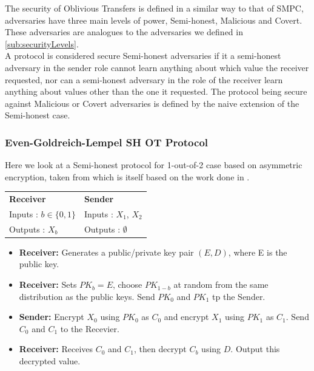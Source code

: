 \documentclass[a4paper,10pt]{article}
\begin{document}
			The security of Oblivious Transfers is defined in a similar way to that of SMPC, adversaries have three main levels of power, Semi-honest, Malicious and Covert. These adversaries are analogues to the adversaries we defined in \ref{sub:securityLevels}.\\

			A protocol is considered secure Semi-honest adversaries if it a semi-honest adversary in the sender role cannot learn anything about which value the receiver requested, nor can a semi-honest adversary in the role of the receiver learn anything about values other than the one it requested. The protocol being secure against Malicious or Covert adversaries is defined by the naive extension of the Semi-honest case.\\

		\subsubsection{Even-Goldreich-Lempel SH OT Protocol}
			Here we look at a Semi-honest protocol for 1-out-of-2 case based on asymmetric encryption, taken from \cite{PinkasSlides2014} which is itself based on the work done in \cite{EvenEtAl85}.\\

			\begin{tabular}[!htb]{p{6cm}  p{6cm}}
					\textbf{Receiver} & \textbf{Sender}\\
					Inputs : $b \in \{0, 1\}$ & Inputs : $X_1$, $X_2$\\
					Outputs : $X_b$ & Outputs : $\emptyset$\\
			\end{tabular}

			\begin{itemize}
 				\setlength{\itemsep}{0.5pt}
 				\setlength{\parskip}{0pt}
 				\setlength{\parsep}{0pt}
				
				\item \textbf{Receiver:} Generates a public/private key pair $(E, D)$, where E is the public key.\\
				\item \textbf{Receiver:} Sets $PK_b = E$, choose $PK_{1-b}$ at random from the same distribution as the public keys. Send $PK_0$ and $PK_1$ tp the Sender.\\
				\item \textbf{Sender:} Encrypt $X_0$ using $PK_0$ as $C_0$ and encrypt $X_1$ using $PK_1$ as $C_1$. Send $C_0$ and $C_1$ to the Recevier.\\
				\item \textbf{Receiver:} Receives $C_0$ and $C_1$, then decrypt $C_b$ using $D$. Output this decrypted value.
			\end{itemize}
\end{document}
